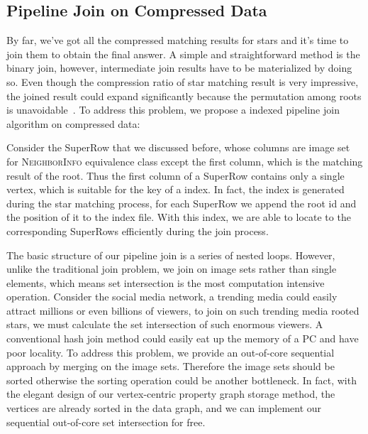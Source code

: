 \subsection{Pipeline Join on Compressed Data}\label{sec:match_join}
By far, we've got all the compressed matching results for stars and it's time to join them to obtain the final answer.
A simple and straightforward method is the binary join, however, intermediate join results have to be materialized by doing so.
Even though the compression ratio of star matching result is very impressive,
the joined result could expand significantly because the permutation among roots is unavoidable~\cite{DBLP:journals/pvldb/SunWWSL12}.
To address this problem, we propose a indexed pipeline join algorithm on compressed data:

Consider the SuperRow that we discussed before, whose columns are image set for \textsc{NeighborInfo} equivalence class except the first column, which is the matching result of the root.
Thus the first column of a SuperRow contains only a single vertex, which is suitable for the key of a index.
In fact, the index is generated during the star matching process,
for each SuperRow we append the root id and the position of it to the index file.
With this index, we are able to locate to the corresponding SuperRows efficiently during the join process.

The basic structure of our pipeline join is a series of nested loops.
However, unlike the traditional join problem, we join on image sets rather than single elements,
which means set intersection is the most computation intensive operation.
Consider the social media network, a trending media could easily attract millions or even billions of viewers,
to join on such trending media rooted stars, we must calculate the set intersection of such enormous viewers.
A conventional hash join method could easily eat up the memory of a PC and have poor locality.
To address this problem, we provide an out-of-core sequential approach by merging on the image sets.
Therefore the image sets should be sorted otherwise the sorting operation could be another bottleneck.
In fact, with the elegant design of our vertex-centric property graph storage method,
the vertices are already sorted in the data graph, and we can implement our sequential out-of-core set intersection for free.
